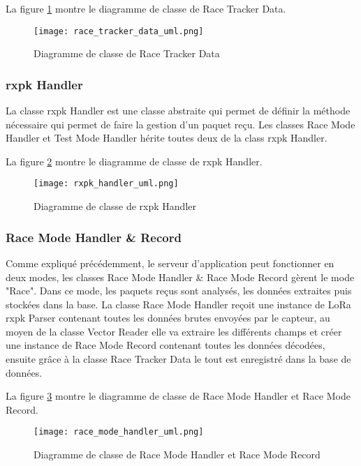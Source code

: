 La figure \ref{fig:race_tracker_data_uml} montre le diagramme de classe de Race Tracker Data.

\begin{figure}[htb]
\centering 
\texttt{[image: race\_tracker\_data\_uml.png]} 
\caption{Diagramme de classe de Race Tracker Data}
\label{fig:race_tracker_data_uml}
\end{figure}

\subsubsection{rxpk Handler}

La classe rxpk Handler est une classe abstraite qui permet de définir la méthode nécessaire qui permet de faire la gestion d'un paquet reçu. Les classes Race Mode Handler et Test Mode Handler hérite toutes deux de la class rxpk Handler.

La figure \ref{fig:rxpk_handler_uml} montre le diagramme de classe de rxpk Handler.

\begin{figure}[htb]
\centering 
\texttt{[image: rxpk\_handler\_uml.png]} 
\caption{Diagramme de classe de rxpk Handler}
\label{fig:rxpk_handler_uml}
\end{figure}

\subsubsection{Race Mode Handler \& Record}

Comme expliqué précédemment, le serveur d'application peut fonctionner en deux modes, les classes Race Mode Handler \& Race Mode Record gèrent le mode "Race". Dans ce mode, les paquets reçus sont analysés, les données extraites puis stockées dans la base. La classe Race Mode Handler reçoit une instance de LoRa rxpk Parser contenant toutes les données brutes envoyées par le capteur, au moyen de la classe Vector Reader elle va extraire les différents champs et créer une instance de Race Mode Record contenant toutes les données décodées, ensuite grâce à la classe Race Tracker Data le tout est enregistré dans la base de données.

La figure \ref{fig:race_mode_handler_uml} montre le diagramme de classe de Race Mode Handler et Race Mode Record.

\begin{figure}[htb]
\centering 
\texttt{[image: race\_mode\_handler\_uml.png]} 
\caption{Diagramme de classe de Race Mode Handler et Race Mode Record}
\label{fig:race_mode_handler_uml}
 \end{figure}

